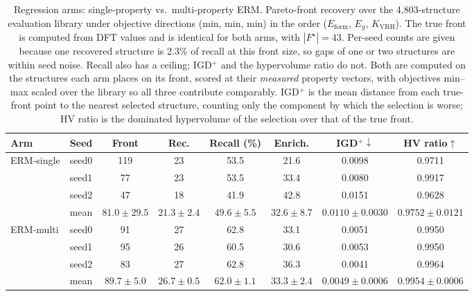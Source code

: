 \begin{table}[htbp]
\renewcommand{\arraystretch}{1.2}
\setlength{\tabcolsep}{4pt}
\caption{Regression arms: single-property vs.\ multi-property ERM. Pareto-front recovery over the 4{,}803-structure evaluation library under objective directions (min, min, min) in the order ($E_\mathrm{form}$, $E_g$, $K_\mathrm{VRH}$). The true front is computed from DFT values and is identical for both arms, with $|F^\star|{=}43$. Per-seed counts are given because one recovered structure is 2.3\% of recall at this front size, so gaps of one or two structures are within seed noise. Recall also has a ceiling; IGD$^+$ and the hypervolume ratio do not. Both are computed on the structures each arm places on its front, scored at their \emph{measured} property vectors, with objectives min--max scaled over the library so all three contribute comparably. IGD$^+$ is the mean distance from each true-front point to the nearest selected structure, counting only the component by which the selection is worse; HV ratio is the dominated hypervolume of the selection over that of the true front.}
\label{tab:pareto_arms_erm_heldout}
\centering
\footnotesize
\begin{tabular}{@{}llcccccc@{}}
\hline\hline
\textbf{Arm} & \textbf{Seed} & \textbf{Front} & \textbf{Rec.} & \textbf{Recall (\%)} & \textbf{Enrich.} & \textbf{IGD$^+\downarrow$} & \textbf{HV ratio$\uparrow$} \\
\hline
\multirow{4}{*}{ERM-single}
  & seed0 & 119 & 23 & 53.5 & 21.6 & 0.0098 & 0.9711 \\
  & seed1 & 77 & 23 & 53.5 & 33.4 & 0.0080 & 0.9917 \\
  & seed2 & 47 & 18 & 41.9 & 42.8 & 0.0151 & 0.9628 \\
  & mean & $81.0 \pm 29.5$ & $21.3 \pm 2.4$ & $49.6 \pm 5.5$ & $32.6 \pm 8.7$ & $0.0110 \pm 0.0030$ & $0.9752 \pm 0.0121$ \\
\hline
\multirow{4}{*}{ERM-multi}
  & seed0 & 91 & 27 & 62.8 & 33.1 & 0.0051 & 0.9950 \\
  & seed1 & 95 & 26 & 60.5 & 30.6 & 0.0053 & 0.9950 \\
  & seed2 & 83 & 27 & 62.8 & 36.3 & 0.0041 & 0.9964 \\
  & mean & $89.7 \pm 5.0$ & $26.7 \pm 0.5$ & $62.0 \pm 1.1$ & $33.3 \pm 2.4$ & $0.0049 \pm 0.0006$ & $0.9954 \pm 0.0006$ \\
\hline\hline
\end{tabular}
\end{table}
